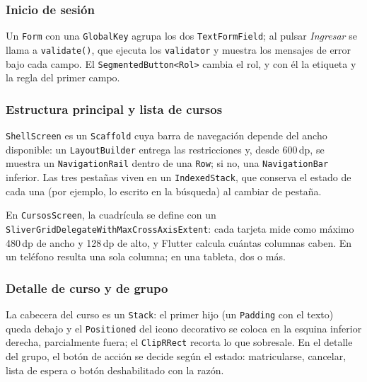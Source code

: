 \subsubsection{Inicio de sesión}
Un \texttt{Form} con una \texttt{GlobalKey} agrupa los dos \texttt{TextFormField}; al pulsar \emph{Ingresar} se llama a \texttt{validate()}, que ejecuta los \texttt{validator} y muestra los mensajes de error bajo cada campo. El \texttt{SegmentedButton<Rol>} cambia el rol, y con él la etiqueta y la regla del primer campo.



\subsubsection{Estructura principal y lista de cursos}
\texttt{ShellScreen} es un \texttt{Scaffold} cuya barra de navegación depende del ancho disponible: un \texttt{LayoutBuilder} entrega las restricciones y, desde 600\,dp, se muestra un \texttt{NavigationRail} dentro de una \texttt{Row}; si no, una \texttt{NavigationBar} inferior. Las tres pestañas viven en un \texttt{IndexedStack}, que conserva el estado de cada una (por ejemplo, lo escrito en la búsqueda) al cambiar de pestaña.



En \texttt{CursosScreen}, la cuadrícula se define con un \texttt{SliverGridDelegateWithMaxCrossAxisExtent}: cada tarjeta mide como máximo 480\,dp de ancho y 128\,dp de alto, y Flutter calcula cuántas columnas caben. En un teléfono resulta una sola columna; en una tableta, dos o más.



\subsubsection{Detalle de curso y de grupo}
La cabecera del curso es un \texttt{Stack}: el primer hijo (un \texttt{Padding} con el texto) queda debajo y el \texttt{Positioned} del icono decorativo se coloca en la esquina inferior derecha, parcialmente fuera; el \texttt{ClipRRect} recorta lo que sobresale. En el detalle del grupo, el botón de acción se decide según el estado: matricularse, cancelar, lista de espera o botón deshabilitado con la razón.

